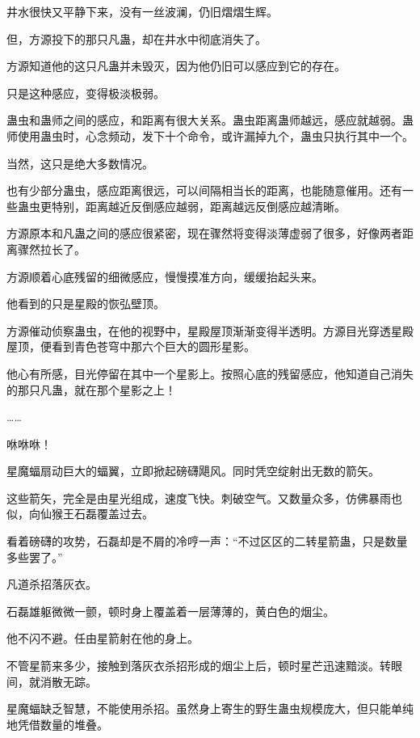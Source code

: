 
\begin{this_body}



井水很快又平静下来，没有一丝波澜，仍旧熠熠生辉。

但，方源投下的那只凡蛊，却在井水中彻底消失了。

方源知道他的这只凡蛊并未毁灭，因为他仍旧可以感应到它的存在。

只是这种感应，变得极淡极弱。

蛊虫和蛊师之间的感应，和距离有很大关系。蛊虫距离蛊师越远，感应就越弱。蛊师使用蛊虫时，心念频动，发下十个命令，或许漏掉九个，蛊虫只执行其中一个。

当然，这只是绝大多数情况。

也有少部分蛊虫，感应距离很远，可以间隔相当长的距离，也能随意催用。还有一些蛊虫更特别，距离越近反倒感应越弱，距离越远反倒感应越清晰。

方源原本和凡蛊之间的感应很紧密，现在骤然将变得淡薄虚弱了很多，好像两者距离骤然拉长了。

方源顺着心底残留的细微感应，慢慢摸准方向，缓缓抬起头来。

他看到的只是星殿的恢弘壁顶。

方源催动侦察蛊虫，在他的视野中，星殿屋顶渐渐变得半透明。方源目光穿透星殿屋顶，便看到青色苍穹中那六个巨大的圆形星影。

他心有所感，目光停留在其中一个星影上。按照心底的残留感应，他知道自己消失的那只凡蛊，就在那个星影之上！

……

咻咻咻！

星魔蝠扇动巨大的蝠翼，立即掀起磅礴飓风。同时凭空绽射出无数的箭矢。

这些箭矢，完全是由星光组成，速度飞快。刺破空气。又数量众多，仿佛暴雨也似，向仙猴王石磊覆盖过去。

看着磅礴的攻势，石磊却是不屑的冷哼一声：“不过区区的二转星箭蛊，只是数量多些罢了。”

凡道杀招落灰衣。

石磊雄躯微微一颤，顿时身上覆盖着一层薄薄的，黄白色的烟尘。

他不闪不避。任由星箭射在他的身上。

不管星箭来多少，接触到落灰衣杀招形成的烟尘上后，顿时星芒迅速黯淡。转眼间，就消散无踪。

星魔蝠缺乏智慧，不能使用杀招。虽然身上寄生的野生蛊虫规模庞大，但只能单纯地凭借数量的堆叠。


\end{this_body}
